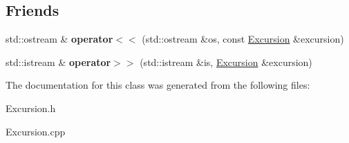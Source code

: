 \subsection*{Friends}
\begin{DoxyCompactItemize}
\item 
\hypertarget{class_excursion_af70b8892ec207843abcaf672f510a890}{}std\+::ostream \& {\bfseries operator$<$$<$} (std\+::ostream \&os, const \hyperlink{class_excursion}{Excursion} \&excursion)\label{class_excursion_af70b8892ec207843abcaf672f510a890}

\item 
\hypertarget{class_excursion_afdf9047952f2241c224581955c23bda1}{}std\+::istream \& {\bfseries operator$>$$>$} (std\+::istream \&is, \hyperlink{class_excursion}{Excursion} \&excursion)\label{class_excursion_afdf9047952f2241c224581955c23bda1}

\end{DoxyCompactItemize}


The documentation for this class was generated from the following files\+:\begin{DoxyCompactItemize}
\item 
Excursion.\+h\item 
Excursion.\+cpp\end{DoxyCompactItemize}
